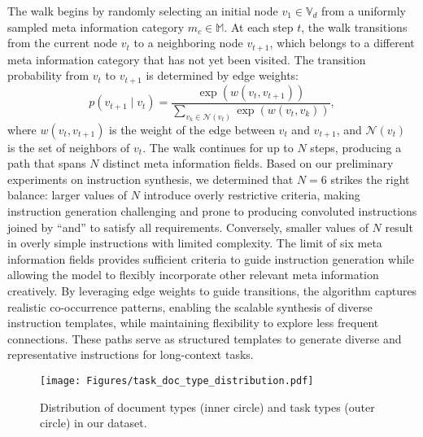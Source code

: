 The walk begins by randomly selecting an initial node $v_1 \in \mathbb{V}_d$ from a uniformly sampled meta information category $m_c \in \mathbb{M}$. 
At each step $t$, the walk transitions from the current node $v_t$ to a neighboring node $v_{t+1}$, which belongs to a different meta information category that has not yet been visited. The transition probability from $v_t$ to $v_{t+1}$ is determined by edge weights:
\begin{equation}
    p(v_{t+1} \mid v_t) = \frac{\exp(w(v_t, v_{t+1}))}{\sum_{v_k \in \mathcal{N}(v_t)} \exp(w(v_t, v_k))},
\end{equation}
where $w(v_t, v_{t+1})$ is the weight of the edge between $v_t$ and $v_{t+1}$, and $\mathcal{N}(v_t)$ is the set of neighbors of $v_t$. 
The walk continues for up to $N$ steps, producing a path that spans $N$ distinct meta information fields. 
Based on our preliminary experiments on instruction synthesis, we determined that $N = 6$ strikes the right balance: larger values of $N$ introduce overly restrictive criteria, making instruction generation challenging and prone to producing convoluted instructions joined by ``and'' to satisfy all requirements. Conversely, smaller values of $N$ result in overly simple instructions with limited complexity. 
The limit of six meta information fields provides sufficient criteria to guide instruction generation while allowing the model to flexibly incorporate other relevant meta information creatively.
By leveraging edge weights to guide transitions, the algorithm captures realistic co-occurrence patterns, enabling the scalable synthesis of diverse instruction templates, while maintaining flexibility to explore less frequent connections. These paths serve as structured templates to generate diverse and representative instructions for long-context tasks.

\begin{wrapfigure}{r}{0.5\textwidth}
    \vspace{-0.2in}
    \centering
    \texttt{[image: Figures/task\_doc\_type\_distribution.pdf]}
    \caption{Distribution of document types (inner circle) and task types (outer circle) in our dataset.}
    \label{fig:task_doc_type_distribution}
    \vspace{-0.2in}
\end{wrapfigure}


